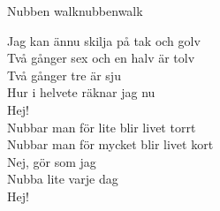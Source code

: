 \begin{song}{Nubben walk}{nubbenwalk}
\begin{vers}
Jag kan ännu skilja på tak och golv\\
Två gånger sex och en halv är tolv\\
Två gånger tre är sju\\
Hur i helvete räknar jag nu\\
Hej!\\
Nubbar man för lite blir livet torrt\\
Nubbar man för mycket blir livet kort\\
Nej, gör som jag\\
Nubba lite varje dag\\
Hej!\\
\end{vers}
\end{song}
